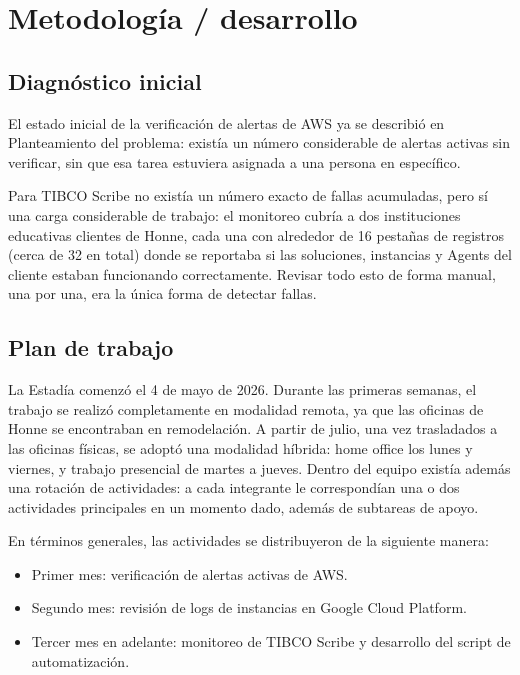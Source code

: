 \section{Metodología / desarrollo}
\label{ch:metodologia}

\subsection{Diagnóstico inicial}
\label{sec:diagnostico_inicial}

El estado inicial de la verificación de alertas de AWS ya se describió en Planteamiento del problema: existía un número considerable de alertas activas sin verificar, sin que esa tarea estuviera asignada a una persona en específico.

Para TIBCO Scribe no existía un número exacto de fallas acumuladas, pero sí una carga considerable de trabajo: el monitoreo cubría a dos instituciones educativas clientes de Honne, cada una con alrededor de 16 pestañas de registros (cerca de 32 en total) donde se reportaba si las soluciones, instancias y Agents del cliente estaban funcionando correctamente. Revisar todo esto de forma manual, una por una, era la única forma de detectar fallas.

\subsection{Plan de trabajo}
\label{sec:plan_trabajo}

La Estadía comenzó el 4 de mayo de 2026. Durante las primeras semanas, el trabajo se realizó completamente en modalidad remota, ya que las oficinas de Honne se encontraban en remodelación. A partir de julio, una vez trasladados a las oficinas físicas, se adoptó una modalidad híbrida: home office los lunes y viernes, y trabajo presencial de martes a jueves. Dentro del equipo existía además una rotación de actividades: a cada integrante le correspondían una o dos actividades principales en un momento dado, además de subtareas de apoyo.

En términos generales, las actividades se distribuyeron de la siguiente manera:
\begin{itemize}
    \item Primer mes: verificación de alertas activas de AWS.
    \item Segundo mes: revisión de logs de instancias en Google Cloud Platform.
    \item Tercer mes en adelante: monitoreo de TIBCO Scribe y desarrollo del script de automatización.
\end{itemize}

